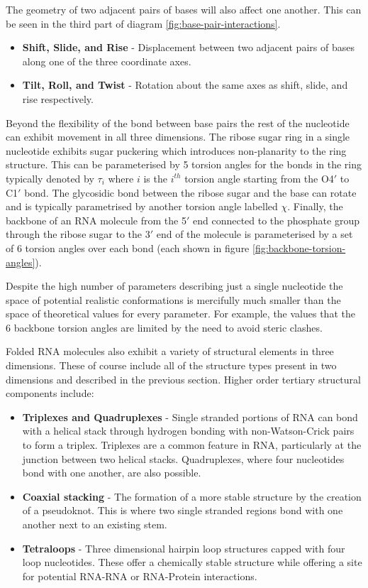 \documentclass[journal]{IEEEtran}
\begin{document}
The geometry of two adjacent pairs of bases will also affect one another. This can be seen in the third part of diagram \ref{fig:base-pair-interactions}.

\begin{itemize}
	\item \textbf{Shift, Slide, and Rise} - Displacement between two adjacent pairs of bases along one of the three coordinate axes.
	\item \textbf{Tilt, Roll, and Twist} - Rotation about the same axes as shift, slide, and rise respectively.
\end{itemize}

Beyond the flexibility of the bond between base pairs the rest of the nucleotide can exhibit movement in all three dimensions. The ribose sugar ring in a single nucleotide exhibits sugar puckering which introduces non-planarity to the ring structure. This can be parameterised by 5 torsion angles for the bonds in the ring typically denoted by $\tau_i$ where $i$ is the $i^{th}$ torsion angle starting from the O4$'$ to C1$'$ bond. The glycosidic bond between the ribose sugar and the base can rotate and is typically parametrised by another torsion angle labelled $\chi$. Finally, the backbone of an RNA molecule from the 5$'$ end connected to the phosphate group through the ribose sugar to the 3$'$ end of the molecule is parameterised by a set of 6 torsion angles over each bond (each shown in figure \ref{fig:backbone-torsion-angles}).

Despite the high number of parameters describing just a single nucleotide the space of potential realistic conformations is mercifully much smaller than the space of theoretical values for every parameter. For example, the values that the 6 backbone torsion angles are limited by the need to avoid steric clashes.

Folded RNA molecules also exhibit a variety of structural elements in three dimensions. These of course include all of the structure types present in two dimensions and described in the previous section. Higher order tertiary structural components include:

\begin{itemize}
	\item \textbf{Triplexes and Quadruplexes} - Single stranded portions of RNA can bond with a helical stack through hydrogen bonding with non-Watson-Crick pairs to form a triplex. Triplexes are a common feature in RNA, particularly at the junction between two helical stacks. Quadruplexes, where four nucleotides bond with one another, are also possible.
	\item \textbf{Coaxial stacking} - The formation of a more stable structure by the creation of a pseudoknot. This is where two single stranded regions bond with one another next to an existing stem.
	\item \textbf{Tetraloops} - Three dimensional hairpin loop structures capped with four loop nucleotides. These offer a chemically stable structure while offering a site for potential RNA-RNA or RNA-Protein interactions.
\end{itemize}
\end{document}

